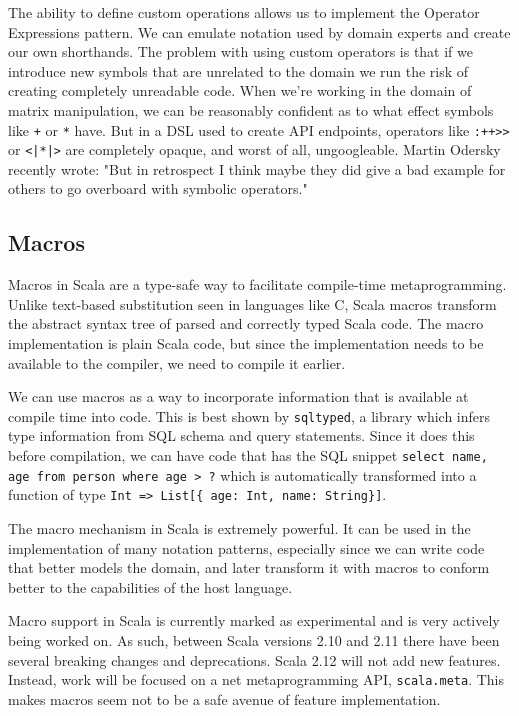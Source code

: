 The ability to define custom operations allows us to implement the Operator Expressions pattern. We can emulate notation used by domain experts and create our own shorthands. The problem with using custom operators is that if we introduce new symbols that are unrelated to the domain we run the risk of creating completely unreadable code. When we're working in the domain of matrix manipulation, we can be reasonably confident as to what effect symbols like \texttt{+} or \texttt{*} have. But in a DSL used to create API endpoints, operators like \texttt{:++>>} or \texttt{<|*|>} are completely opaque, and worst of all, ungoogleable. Martin Odersky recently wrote: "But in retrospect I think maybe they did give a bad example for others to go overboard with symbolic operators." \autocite{Odersky:2016}


\subsection{Macros}

Macros in Scala are a type-safe way to facilitate compile-time metaprogramming. Unlike text-based substitution seen in languages like C, Scala macros transform the abstract syntax tree of parsed and correctly typed Scala code. The macro implementation is plain Scala code, but since the implementation needs to be available to the compiler, we need to compile it earlier.

We can use macros as a way to incorporate information that is available at compile time into code. This is best shown by \texttt{sqltyped}, a library which infers type information from SQL schema and query statements. Since it does this before compilation, we can have code that has the SQL snippet \texttt{select name, age from person where age > ?} which is automatically transformed into a function of type \texttt{Int => List[\{ age: Int, name: String\}]}.

The macro mechanism in Scala is extremely powerful. It can be used in the implementation of many notation patterns, especially since we can write code that better models the domain, and later transform it with macros to conform better to the capabilities of the host language.

Macro support in Scala is currently marked as experimental and is very actively being worked on. As such, between Scala versions 2.10 and 2.11 there have been several breaking changes and deprecations. Scala 2.12 will not add new features. Instead, work will be focused on a net metaprogramming API, \texttt{scala.meta}. This makes macros seem not to be a safe avenue of feature implementation.

